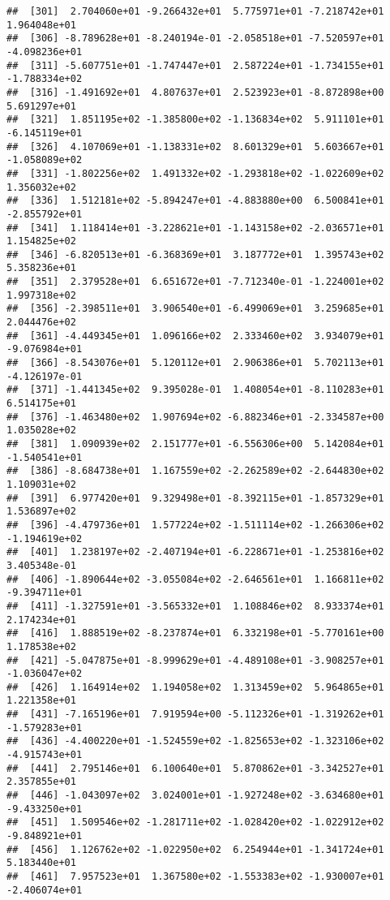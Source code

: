 \documentclass[]{book}
\begin{document}
\begin{verbatim}
##  [301]  2.704060e+01 -9.266432e+01  5.775971e+01 -7.218742e+01  1.964048e+01
##  [306] -8.789628e+01 -8.240194e-01 -2.058518e+01 -7.520597e+01 -4.098236e+01
##  [311] -5.607751e+01 -1.747447e+01  2.587224e+01 -1.734155e+01 -1.788334e+02
##  [316] -1.491692e+01  4.807637e+01  2.523923e+01 -8.872898e+00  5.691297e+01
##  [321]  1.851195e+02 -1.385800e+02 -1.136834e+02  5.911101e+01 -6.145119e+01
##  [326]  4.107069e+01 -1.138331e+02  8.601329e+01  5.603667e+01 -1.058089e+02
##  [331] -1.802256e+02  1.491332e+02 -1.293818e+02 -1.022609e+02  1.356032e+02
##  [336]  1.512181e+02 -5.894247e+01 -4.883880e+00  6.500841e+01 -2.855792e+01
##  [341]  1.118414e+01 -3.228621e+01 -1.143158e+02 -2.036571e+01  1.154825e+02
##  [346] -6.820513e+01 -6.368369e+01  3.187772e+01  1.395743e+02  5.358236e+01
##  [351]  2.379528e+01  6.651672e+01 -7.712340e-01 -1.224001e+02  1.997318e+02
##  [356] -2.398511e+01  3.906540e+01 -6.499069e+01  3.259685e+01  2.044476e+02
##  [361] -4.449345e+01  1.096166e+02  2.333460e+02  3.934079e+01 -9.076984e+01
##  [366] -8.543076e+01  5.120112e+01  2.906386e+01  5.702113e+01 -4.126197e-01
##  [371] -1.441345e+02  9.395028e-01  1.408054e+01 -8.110283e+01  6.514175e+01
##  [376] -1.463480e+02  1.907694e+02 -6.882346e+01 -2.334587e+00  1.035028e+02
##  [381]  1.090939e+02  2.151777e+01 -6.556306e+00  5.142084e+01 -1.540541e+01
##  [386] -8.684738e+01  1.167559e+02 -2.262589e+02 -2.644830e+02  1.109031e+02
##  [391]  6.977420e+01  9.329498e+01 -8.392115e+01 -1.857329e+01  1.536897e+02
##  [396] -4.479736e+01  1.577224e+02 -1.511114e+02 -1.266306e+02 -1.194619e+02
##  [401]  1.238197e+02 -2.407194e+01 -6.228671e+01 -1.253816e+02  3.405348e-01
##  [406] -1.890644e+02 -3.055084e+02 -2.646561e+01  1.166811e+02 -9.394711e+01
##  [411] -1.327591e+01 -3.565332e+01  1.108846e+02  8.933374e+01  2.174234e+01
##  [416]  1.888519e+02 -8.237874e+01  6.332198e+01 -5.770161e+00  1.178538e+02
##  [421] -5.047875e+01 -8.999629e+01 -4.489108e+01 -3.908257e+01 -1.036047e+02
##  [426]  1.164914e+02  1.194058e+02  1.313459e+02  5.964865e+01  1.221358e+01
##  [431] -7.165196e+01  7.919594e+00 -5.112326e+01 -1.319262e+01 -1.579283e+01
##  [436] -4.400220e+01 -1.524559e+02 -1.825653e+02 -1.323106e+02 -4.915743e+01
##  [441]  2.795146e+01  6.100640e+01  5.870862e+01 -3.342527e+01  2.357855e+01
##  [446] -1.043097e+02  3.024001e+01 -1.927248e+02 -3.634680e+01 -9.433250e+01
##  [451]  1.509546e+02 -1.281711e+02 -1.028420e+02 -1.022912e+02 -9.848921e+01
##  [456]  1.126762e+02 -1.022950e+02  6.254944e+01 -1.341724e+01  5.183440e+01
##  [461]  7.957523e+01  1.367580e+02 -1.553383e+02 -1.930007e+01 -2.406074e+01

\end{verbatim}
\end{document}
